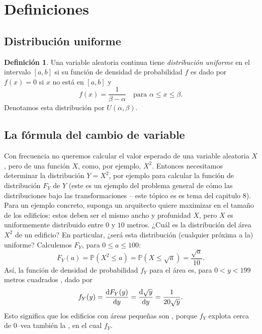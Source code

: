 \documentclass[10pt,twoside=false,twocolumn=false,BCOR=12mm,DIV=calc]{scrartcl} %
\theoremstyle{definition}
\newtheorem{definition}[section]{Definición}
\begin{document}
\section{Definiciones}
\label{sec:defi}


\subsection{Distribución uniforme}

\begin{definition}
  Una variable aleatoria continua tiene \textit{distribución uniforme} en el intervalo $\left[a,b\right]$ si su función de densidad de probabilidad $f$ es dado por $f(x)=0$ si $x$ no está en $\left[a,b\right]$ y
  \begin{equation*}
    f(x)=\frac{1}{\beta-\alpha}\quad\text{para }\alpha \le x\le \beta.
  \end{equation*}
 Denotamos esta distribución por $U\left(\alpha,\beta\right)$.
\end{definition}

\subsection{La fórmula del cambio de variable}
\label{sec:change}

Con frecuencia no queremos calcular el valor esperado de una variable aleatoria $X$, pero %
de una función $X$, como, por ejemplo, $X^2$. Entonces necesitamos determinar la distribución $Y=X^2$, por ejemplo para calcular la función de distribución $F_Y$ de $Y$ (este es un ejemplo del problema general de cómo las distribuciones bajo las transformaciones -- este tópico es es tema del capitulo 8). Para un ejemplo concreto, suponga un arquitecto quiere maximizar %
en el tamaño de los edificios: estos deben ser el mismo ancho y profunidad $X$, pero $X$ es uniformemente distribuido entre $0$ y $10$ metros. ¿Cuál es la distribución del área $X^2$ de un edificio? En particular, ¿será esta distribución (cualquier próxima a la) uniforme? Calculemos $F_Y$, para $0\le a\le 100$:
\begin{equation*}
  F_Y(a)=\mathds{P}\left(X^2\le a\right)=\mathds{P}\left(X\le\sqrt{a}\right)=\frac{\sqrt{a}}{10}.
\end{equation*}
Así, la función de densidad de probabilidad $f_Y$ para el área es, para $0<y<199$ metros cuadrados %
, dado por
\begin{equation*}
  f_Y(y)=\diff{F_Y(y)}{y}=\diff{\sqrt{y}}{y}=\frac{1}{20\sqrt{y}}.
\end{equation*}
Esto significa que los edificios con áreas pequeñas son %
, porque $f_Y$ explota cerca de 0--vea también la %
, en el cual %
$f_Y$.
\end{document}
